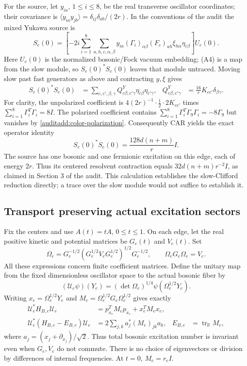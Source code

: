 For the source, let $y_{ia}$, $1\le i\le8$, be the real transverse
oscillator coordinates; their covariance is
$\langle y_{ia}y_{jb}\rangle=\delta_{ij}\delta_{ab}/(2r)$.
In the conventions of the audit the mixed Yukawa source is
\[
 S_e(0)=\left[-2i\sum_{i=1}^8\sum_{a,h,c,\alpha,\beta}
 y_{ia}(\Gamma_i)_{\alpha\beta}(F_c)_{ah}
 \xi_{h\alpha}\eta_{c\beta}\right]U_e(0).
 \tag{A4}\label{auditadd:source}
\]
Here $U_e(0)$ is the normalized bosonic/Fock vacuum embedding; (A4)
is a map from the slow module, so $S_e(0)^*S_e(0)$ leaves that module
untraced. Moving slow past fast generators as above and contracting
$y,\xi$ gives
\begin{align}
 S_e(0)^*S_e(0)
 &=\sum_{c,c',\beta,\gamma}
    Q^Y_{c\beta,c'\gamma}\eta_{c\beta}\eta_{c'\gamma},
 & Q^Y_{c\beta,c'\gamma}
 &=\frac{16}{r}K_{cc'}\delta_{\beta\gamma}.
 \tag{A5}\label{auditadd:yukawa-coefficient}
\end{align}
For clarity, the unpolarized coefficient is
$4(2r)^{-1}\cdot\tfrac12\cdot2K_{cc'}$
times $\sum_{i=1}^8\Gamma_i^T\Gamma_i=8I$.
The polarized coefficient contains
$\sum_{i=1}^8\Gamma_i^T\Gamma_9\Gamma_i=-8\Gamma_9$
but vanishes by \eqref{auditadd:color-polarization}.
Consequently CAR yields the exact operator identity
\[
 S_e(0)^*S_e(0)=\frac{128d(n+m)}r I.
 \tag{A6}\label{auditadd:source-scalar}
\]
The source has one bosonic and one fermionic excitation on this edge,
each of energy $2r$. Thus its centered resolvent contraction equals
$32d(n+m)r^{-2}I$, as claimed in Section 3 of the audit. This calculation
establishes the slow-Clifford reduction directly; a trace over the slow
module would not suffice to establish it.

\subsection{Transport preserving actual excitation sectors}
Fix the centers and use $A(t)=tA$, $0\le t\le1$. On each edge, let the
real positive kinetic and potential matrices be $G_e(t)$ and $V_e(t)$.
Set
\[
 \Omega_e=G_e^{-1/2}(G_e^{1/2}V_eG_e^{1/2})^{1/2}G_e^{-1/2},
 \qquad \Omega_eG_e\Omega_e=V_e.
\]
All these expressions concern finite coefficient matrices. Define the
unitary map from the fixed dimensionless oscillator space to the actual
bosonic fiber by
\[
 (\mathcal U_e\psi)(Y_e)
   =(\det\Omega_e)^{1/4}\psi(\Omega_e^{1/2}Y_e).
\]
Writing $x_e=\Omega_e^{1/2}Y_e$ and
$M_e=\Omega_e^{1/2}G_e\Omega_e^{1/2}$ gives exactly
\begin{align}
 \mathcal U_e^*H_{B,e}\mathcal U_e
 &=p_{x_e}^TM_ep_{x_e}+x_e^TM_ex_e,\nonumber\\
 \mathcal U_e^*(H_{B,e}-E_{B,e})\mathcal U_e
 &=2\sum_{j,k}a_j^*(M_e)_{jk}a_k,
 &E_{B,e}&=\operatorname{tr}_{\mathbb R}M_e,
 \tag{A7}\label{auditadd:boson-transport}
\end{align}
where $a_j=(x_j+\partial_{x_j})/\sqrt2$. Thus total bosonic excitation
number is invariant even when $G_e,V_e$ do not commute. There is no
choice of eigenvectors or division by differences of internal
frequencies. At $t=0$, $M_e=r_eI$.

